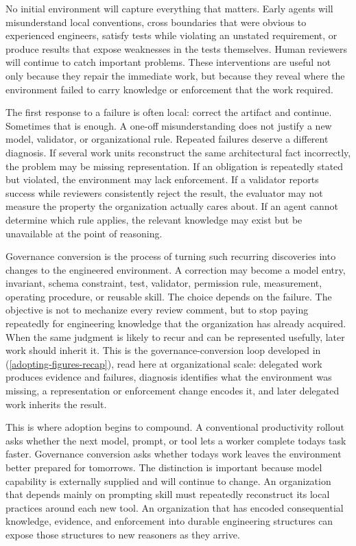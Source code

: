 

No initial environment will capture everything that matters. Early agents will misunderstand local conventions, cross boundaries that were obvious to experienced engineers, satisfy tests while violating an unstated requirement, or produce results that expose weaknesses in the tests themselves. Human reviewers will continue to catch important problems. These interventions are useful not only because they repair the immediate work, but because they reveal where the environment failed to carry knowledge or enforcement that the work required.

The first response to a failure is often local: correct the artifact and continue. Sometimes that is enough. A one-off misunderstanding does not justify a new model, validator, or organizational rule. Repeated failures deserve a different diagnosis. If several work units reconstruct the same architectural fact incorrectly, the problem may be missing representation. If an obligation is repeatedly stated but violated, the environment may lack enforcement. If a validator reports success while reviewers consistently reject the result, the evaluator may not measure the property the organization actually cares about. If an agent cannot determine which rule applies, the relevant knowledge may exist but be unavailable at the point of reasoning.

Governance conversion is the process of turning such recurring discoveries into changes to the engineered environment. A correction may become a model entry, invariant, schema constraint, test, validator, permission rule, measurement, operating procedure, or reusable skill. The choice depends on the failure. The objective is not to mechanize every review comment, but to stop paying repeatedly for engineering knowledge that the organization has already acquired. When the same judgment is likely to recur and can be represented usefully, later work should inherit it. This is the governance-conversion loop developed in  (\autoref{adopting-figures-recap}), read here at organizational scale: delegated work produces evidence and failures, diagnosis identifies what the environment was missing, a representation or enforcement change encodes it, and later delegated work inherits the result.

This is where adoption begins to compound. A conventional productivity rollout asks whether the next model, prompt, or tool lets a worker complete today\textquotesingle s task faster. Governance conversion asks whether today\textquotesingle s work leaves the environment better prepared for tomorrow\textquotesingle s. The distinction is important because model capability is externally supplied and will continue to change. An organization that depends mainly on prompting skill must repeatedly reconstruct its local practices around each new tool. An organization that has encoded consequential knowledge, evidence, and enforcement into durable engineering structures can expose those structures to new reasoners as they arrive.

